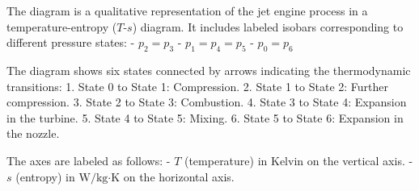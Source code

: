 The diagram is a qualitative representation of the jet engine process in a temperature-entropy (\( T \)-\( s \)) diagram. It includes labeled isobars corresponding to different pressure states:  
- \( p_2 = p_3 \)  
- \( p_1 = p_4 = p_5 \)  
- \( p_0 = p_6 \)  

The diagram shows six states connected by arrows indicating the thermodynamic transitions:  
1. State 0 to State 1: Compression.  
2. State 1 to State 2: Further compression.  
3. State 2 to State 3: Combustion.  
4. State 3 to State 4: Expansion in the turbine.  
5. State 4 to State 5: Mixing.  
6. State 5 to State 6: Expansion in the nozzle.  

The axes are labeled as follows:  
- \( T \) (temperature) in Kelvin on the vertical axis.  
- \( s \) (entropy) in \( \text{W}/\text{kg·K} \) on the horizontal axis.